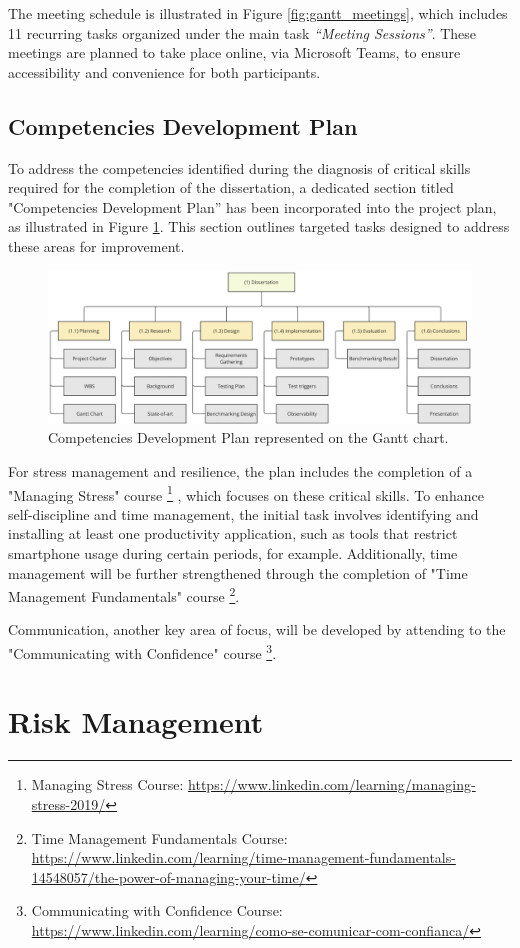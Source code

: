 The meeting schedule is illustrated in Figure \ref{fig:gantt_meetings}, which includes 11 recurring tasks organized under the main task \textit{“Meeting Sessions”}. These meetings are planned to take place online, via Microsoft Teams, to ensure accessibility and convenience for both participants.

\subsection{Competencies Development Plan}

To address the competencies identified during the diagnosis of critical skills required for the completion of the dissertation, a dedicated section titled "Competencies Development Plan” has been incorporated into the project plan, as illustrated in Figure \ref{fig:gantt_competency}. This section outlines targeted tasks designed to address these areas for improvement.

\begin{figure}
      \centering
      \includegraphics[width=\linewidth]{ch-planning/assets/wbs.png}
      \caption{Competencies Development Plan represented on the Gantt chart.}
      \label{fig:gantt_competency}
\end{figure}

For stress management and resilience, the plan includes the completion of a "Managing Stress" course
\footnote{Managing Stress Course: \url{https://www.linkedin.com/learning/managing-stress-2019/}}
, which focuses on these critical skills. To enhance self-discipline and time management, the initial task involves identifying and installing at least one productivity application, such as tools that restrict smartphone usage during certain periods, for example. Additionally, time management will be further strengthened through the completion of "Time Management Fundamentals" course
\footnote{Time Management Fundamentals Course: \url{https://www.linkedin.com/learning/time-management-fundamentals-14548057/the-power-of-managing-your-time/}}.

Communication, another key area of focus, will be developed by attending to the "Communicating with Confidence" course
\footnote{Communicating with Confidence Course: \url{https://www.linkedin.com/learning/como-se-comunicar-com-confianca/}}.

\section{Risk Management}

